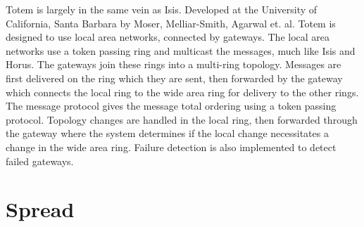 Totem is largely in the same vein as Isis. Developed at the University of
California, Santa Barbara by Moser, Melliar-Smith, Agarwal et. al. Totem is
designed to use local area networks, connected by gateways. The local area
networks use a token passing ring and multicast the messages, much like Isis
and Horus. The gateways join these rings into a multi-ring topology. Messages
are first delivered on the ring which they are sent, then forwarded by the
gateway which connects the local ring to the wide area ring for delivery to
the other rings. The message protocol gives the message total ordering using a
token passing protocol. Topology changes are handled in the local ring, then
forwarded through the gateway where the system determines if the local change
necessitates a change in the wide area ring. Failure detection is also implemented
to detect failed gateways.

\section{Spread}

